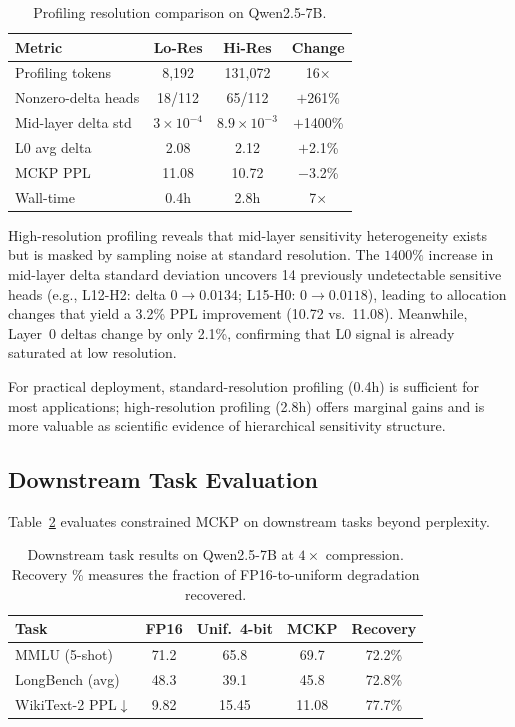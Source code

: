 \documentclass[11pt,a4paper]{article}
\begin{document}
\begin{table}[t]
\centering
\small
\caption{Profiling resolution comparison on Qwen2.5-7B.}
\label{tab:hires}
\begin{tabular}{lccc}
\toprule
\textbf{Metric} & \textbf{Lo-Res} & \textbf{Hi-Res} & \textbf{Change} \\
\midrule
Profiling tokens & 8,192 & 131,072 & 16$\times$ \\
Nonzero-delta heads & 18/112 & 65/112 & $+$261\% \\
Mid-layer delta std & $3 \times 10^{-4}$ & $8.9 \times 10^{-3}$ & $+$1400\% \\
L0 avg delta & 2.08 & 2.12 & $+$2.1\% \\
MCKP PPL & 11.08 & 10.72 & $-$3.2\% \\
Wall-time & 0.4h & 2.8h & 7$\times$ \\
\bottomrule
\end{tabular}
\end{table}

High-resolution profiling reveals that mid-layer sensitivity heterogeneity exists but is masked by sampling noise at standard resolution.
The $1400\%$ increase in mid-layer delta standard deviation uncovers 14 previously undetectable sensitive heads (e.g., L12-H2: delta $0 \to 0.0134$; L15-H0: $0 \to 0.0118$), leading to allocation changes that yield a 3.2\% PPL improvement (10.72 vs.\ 11.08).
Meanwhile, Layer~0 deltas change by only 2.1\%, confirming that L0 signal is already saturated at low resolution.

For practical deployment, standard-resolution profiling (0.4h) is sufficient for most applications; high-resolution profiling (2.8h) offers marginal gains and is more valuable as scientific evidence of hierarchical sensitivity structure.

\subsection{Downstream Task Evaluation}

Table~\ref{tab:downstream} evaluates constrained MCKP on downstream tasks beyond perplexity.

\begin{table}[t]
\centering
\small
\caption{Downstream task results on Qwen2.5-7B at $4\times$ compression. Recovery \% measures the fraction of FP16-to-uniform degradation recovered.}
\label{tab:downstream}
\begin{tabular}{lcccc}
\toprule
\textbf{Task} & \textbf{FP16} & \textbf{Unif.\ 4-bit} & \textbf{MCKP} & \textbf{Recovery} \\
\midrule
MMLU (5-shot) & 71.2 & 65.8 & 69.7 & 72.2\% \\
LongBench (avg) & 48.3 & 39.1 & 45.8 & 72.8\% \\
WikiText-2 PPL$\downarrow$ & 9.82 & 15.45 & 11.08 & 77.7\% \\
\bottomrule
\end{tabular}
\end{table}
\end{document}
